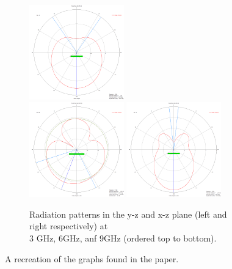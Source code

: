 \documentclass[colorlinks,11pt,a4paper,normalphoto,withhyper,ragged2e]{altareport}
\begin{document}
\begin{figure}[ht!]
\begin{subfigure}[b]{0.45\linewidth}
    	\hfill
		\includegraphics[width=0.45\textwidth]{Images/S1,1-fig-6-recreation-6GHz-XZ.png}\\[2mm]
		\includegraphics[width=0.45\textwidth]{Images/S1,1-fig-6-recreation-9GHz-YZ.png}
    	\hfill
		\includegraphics[width=0.45\textwidth]{Images/S1,1-fig-6-recreation-9GHz-XZ.png}
		\caption{Radiation patterns in the y-z and x-z plane (left and right respectively) at \\3 GHz, 6GHz, anf 9GHz (ordered top to bottom).}\label{fig:recreate_rad_patterns}
	\end{subfigure}
	\caption{A recreation of the graphs found in the paper.}\label{fig:paper_graph_recreation}
\end{figure}

\vspace{5mm}
\end{document}
